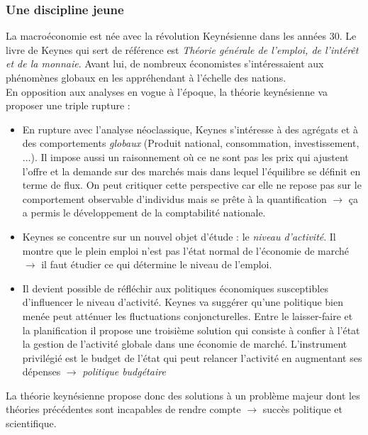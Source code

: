 \documentclass[10pt]{book}
\begin{document}
\subsubsection{Une discipline jeune}
La macroéconomie est née avec la révolution Keynésienne dans les années 30. Le livre de Keynes qui sert de référence est \textit{Théorie générale de l'emploi, de l'intérêt et de la monnaie}. Avant lui, de nombreux économistes s'intéressaient aux phénomènes globaux en les appréhendant à l'échelle des nations. \\
En opposition aux analyses en vogue à l'époque, la théorie keynésienne va proposer une triple rupture :
\begin{itemize}
  \item En rupture avec l'analyse néoclassique, Keynes s'intéresse à des agrégats et à des comportements \textit{globaux} (Produit national, consommation, investissement, ...). Il impose aussi un raisonnement où ce ne sont pas les prix qui ajustent l'offre et la demande sur des marchés mais dans lequel l'équilibre se définit en terme de flux. On peut critiquer cette perspective car elle ne repose pas sur le comportement observable d'individus mais se prête à la quantification $\rightarrow$ ça a permis le développement de la comptabilité nationale.
  \item Keynes se concentre sur un nouvel objet d'étude : le \textit{niveau d'activité}. Il montre que le plein emploi n'est pas l'état normal de l'économie de marché $\rightarrow$ il faut étudier ce qui détermine le niveau de l'emploi.
  \item Il devient possible de réfléchir aux politiques économiques susceptibles d'influencer le niveau d'activité. Keynes va suggérer qu'une politique bien menée peut atténuer les fluctuations conjoncturelles. Entre le laisser-faire et la planification il propose une troisième solution qui consiste à confier à l'état la gestion de l'activité globale dans une économie de marché. L'instrument privilégié est le budget de l'état qui peut relancer l'activité en augmentant ses dépenses $\rightarrow$ \textit{politique budgétaire}
\end{itemize}
La théorie keynésienne propose donc des solutions à un problème majeur dont les théories précédentes sont incapables de rendre compte $\rightarrow$ succès politique et scientifique.
\end{document}
